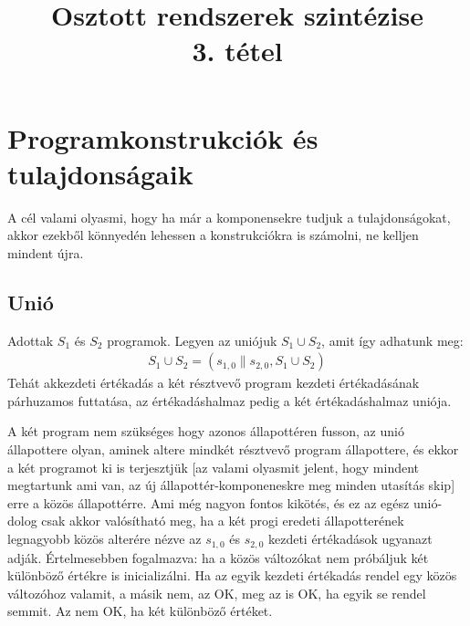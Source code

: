\documentclass{article}
\title{Osztott rendszerek szintézise\\3. tétel}
\begin{document}

\section*{Programkonstrukciók és tulajdonságaik}
A cél valami olyasmi, hogy ha már a komponensekre tudjuk a tulajdonságokat, akkor ezekből könnyedén lehessen a konstrukciókra is számolni, ne kelljen mindent újra.
\subsection*{Unió}
Adottak $S_1$ és $S_2$ programok. Legyen az uniójuk $S_1 \cup S_2$, amit így adhatunk meg:
\begin{align*}
S_1 \cup S_2 = (s_{1,0} \parallel s_{2,0}, S_1 \cup S_2)
\end{align*}
Tehát akkezdeti értékadás a két résztvevő program kezdeti értékadásának párhuzamos futtatása, az értékadáshalmaz pedig a két értékadáshalmaz uniója.

A két program nem szükséges hogy azonos állapottéren fusson, az unió állapottere olyan, aminek altere mindkét résztvevő program állapottere, és ekkor a két programot ki is terjesztjük [az valami olyasmit jelent, hogy mindent megtartunk ami van, az új állapottér-komponeneskre meg minden utasítás skip] erre a közös állapottérre. Ami még nagyon fontos kikötés, és ez az egész unió-dolog csak akkor valósítható meg, ha a két progi eredeti állapotterének legnagyobb közös alterére nézve az $s_{1,0}$ és $s_{2,0}$ kezdeti értékadások ugyanazt adják. Értelmesebben fogalmazva: ha a közös változókat nem próbáljuk két különböző értékre is inicializálni. Ha az egyik kezdeti értékadás rendel egy közös változóhoz valamit, a másik nem, az OK, meg az is OK, ha egyik se rendel semmit. Az nem OK, ha két különböző értéket.
\end{document}
